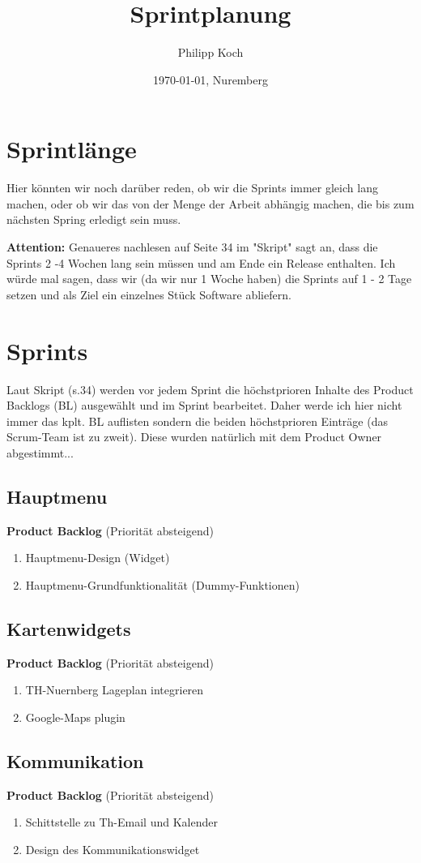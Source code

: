 \documentclass[12pt]{scrartcl}
\title{Sprintplanung}
\author{Philipp Koch}
\date{\today{}, Nuremberg}
\begin{document}
\maketitle

\section{Sprintlänge}
Hier könnten wir noch darüber reden, ob wir die Sprints immer gleich lang machen, oder ob wir das von der Menge der Arbeit abhängig machen, die bis zum nächsten Spring erledigt sein muss.

\textbf{Attention:} Genaueres nachlesen auf Seite 34 im "Skript" sagt an, dass die Sprints 2 -4 Wochen lang sein müssen und am Ende ein Release enthalten. Ich würde mal sagen, dass wir (da wir nur 1 Woche haben) die Sprints auf 1 - 2 Tage setzen und als Ziel ein einzelnes Stück Software abliefern.
\section{Sprints}
Laut Skript (s.34) werden vor jedem Sprint die höchstprioren Inhalte des Product Backlogs (BL) ausgewählt und im Sprint bearbeitet. Daher werde ich hier nicht immer das kplt. BL auflisten sondern die beiden höchstprioren Einträge (das Scrum-Team ist zu zweit). Diese wurden natürlich mit dem Product Owner abgestimmt... 
\subsection{Hauptmenu}
\textbf{Product Backlog} (Priorität absteigend)
\begin{enumerate}
\item Hauptmenu-Design (Widget)
\item Hauptmenu-Grundfunktionalität (Dummy-Funktionen)
\end{enumerate}
\subsection{Kartenwidgets}
\textbf{Product Backlog} (Priorität absteigend)
\begin{enumerate}
\item TH-Nuernberg Lageplan integrieren
\item Google-Maps plugin
\end{enumerate}
\subsection{Kommunikation}
\textbf{Product Backlog} (Priorität absteigend)
\begin{enumerate}
\item Schittstelle zu Th-Email und Kalender
\item Design des Kommunikationswidget
\end{enumerate}
\end{document}
